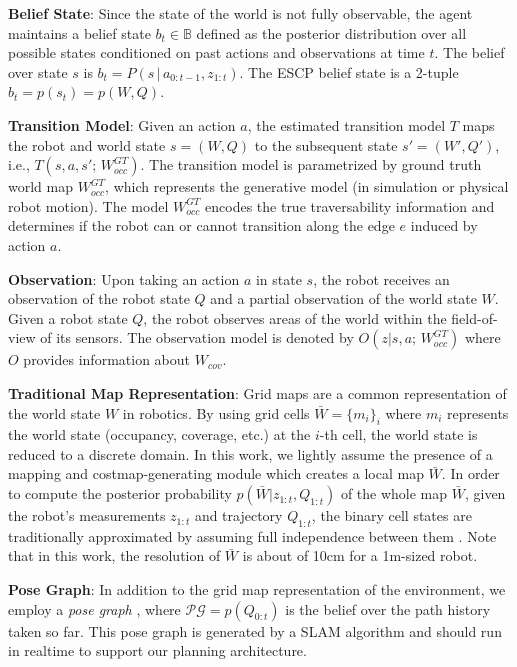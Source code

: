 \documentclass[letterpaper]{article} %
\newcommand{\ph}[1]{{\textbf{#1}:}} %
\begin{document}
\ph{Belief State} Since the state of the world is not fully observable, the agent maintains a belief state $b_t\in \mathbb{B}$ defined as the posterior distribution over all possible states conditioned on past actions and observations at time $t$. The belief over state $s$ is $b_{t} = P(s \,|\, a_{0:t-1}, z_{1:t})$. The ESCP belief state is a 2-tuple $b_t = p(s_t) = p(W,Q)$.

\ph{Transition Model} Given an action $a$, the estimated transition model $T$ maps the robot and world state $s = (W, Q)$ to the subsequent state $s' = (W', Q')$, i.e., $T(s, a, s'; \, W_{occ}^{GT})$. 
The transition model is parametrized by ground truth world map $W_{occ}^{GT}$, which represents the generative model (in simulation or physical robot motion). %
The model $W_{occ}^{GT}$ encodes the true traversability information and determines if the robot can or cannot transition along the edge $e$ induced by action $a$.%

\ph{Observation} Upon taking an action $a$ in state $s$, the robot receives an observation of the robot state $Q$ and a partial observation of the world state $W$. Given a robot state $Q$, the robot observes areas of the world within the field-of-view of its sensors.  The observation model is denoted by $  O(z | s, a; \, W_{occ}^{GT})$
where $O$ provides information about $W_{cov}$.%

\ph{Traditional Map Representation} Grid maps are a common representation of the world state $W$ in robotics. %
By using grid cells $\bar{W}=\{m_i\}_i$ where $m_i$ represents the world state (occupancy, coverage, etc.) at the $i$-th cell, the world state is reduced to a discrete domain.  In this work, we lightly assume the presence of a mapping and costmap-generating module which creates a local map $\bar{W}$.  
In order to compute the posterior probability $p(\bar{W} | z_{1:t}, Q_{1:t})$ of the whole map $\bar{W}$, given the robot's measurements $z_{1:t}$ and trajectory $Q_{1:t}$, the binary cell states are traditionally approximated by assuming full independence between them \cite{TBF05,elfes1990stochastic}. Note that in this work, the resolution of $\bar{W}$ is about of 10cm for a 1m-sized robot.

\ph{Pose Graph} In addition to the grid map representation of the environment, we employ a \textit{pose graph} \cite{thrun2002probabilistic}, where $\mathcal{PG} = p(Q_{0:t})$ is the belief over the path history taken so far.  This pose graph is generated by a SLAM algorithm and should run in realtime to support our planning architecture.  %
\end{document}
